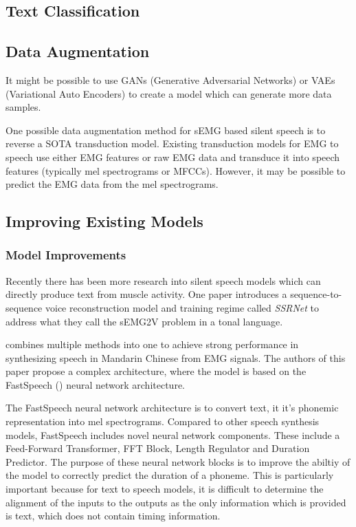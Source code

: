 \subsection{Text Classification}

\subsection{Data Augmentation}

It might be possible to use GANs (Generative Adversarial Networks) or
VAEs (Variational Auto Encoders) to create a model which can generate
more data samples.

One possible data augmentation method for sEMG based silent speech is to
reverse a SOTA transduction model. Existing transduction models for
EMG to speech use either EMG features or raw EMG data and transduce
it into speech features (typically mel spectrograms or MFCCs). However,
it may be possible to predict the EMG data from the mel spectrograms.

\subsection{Improving Existing Models}

\subsubsection{Model Improvements}

Recently there has been more research into silent speech models which
can directly produce text from muscle activity. One paper introduces
a sequence-to-sequence voice reconstruction model and training regime
called \textit{SSRNet} to address what they call the sEMG2V problem
in a tonal language.

combines
multiple methods into one to achieve strong performance in synthesizing
speech in Mandarin Chinese from EMG signals. The authors of this paper
propose a complex architecture, where the model is based on the
FastSpeech (\cite{fastspeech}) neural network architecture.

The FastSpeech
neural network architecture is to convert text, it it's phonemic
representation into mel spectrograms. Compared to other speech
synthesis models, FastSpeech includes novel neural network components.
These include a Feed-Forward Transformer, FFT Block, Length Regulator
and Duration Predictor. The purpose of these neural network blocks
is to improve the abiltiy of the model to correctly predict the duration
of a phoneme. This is particularly important because for text to speech
models, it is difficult to determine the alignment of the inputs to
the outputs as the only information which is provided is text, which
does not contain timing information.

